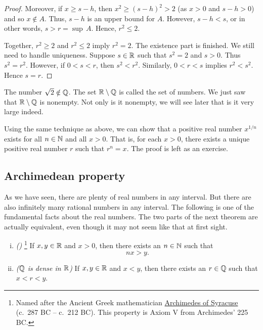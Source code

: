 \begin{example}
\begin{proof}
Moreover, if $x \geq s-h$,
then $x^2 \geq {(s-h)}^2 > 2$ (as $x > 0$ and $s-h > 0$) and so $x \notin A$.
Thus,
$s-h$ is an upper bound for $A$.  However, $s-h < s$,  or in other
words, $s > r = \sup\, A$.  Hence, $r^2 \leq 2$.

\medskip

Together, $r^2 \geq 2$ and $r^2 \leq 2$ imply
$r^2 = 2$.  The existence part is finished.  We still need to
handle uniqueness.  Suppose $s \in {\mathbb{R}}$ such that $s^2 = 2$ and $s > 0$.
Thus $s^2 = r^2$.  However, if $0 < s < r$, then $s^2 < r^2$.  Similarly,
$0 < r < s$ implies $r^2 < s^2$.  Hence $s = r$.
\end{proof}
\end{example}

The number $\sqrt{2} \notin {\mathbb{Q}}$.  The set
${\mathbb{R}} \setminus {\mathbb{Q}}$ is called the set of
\emph{} numbers.  We just saw that ${\mathbb{R}} \setminus {\mathbb{Q}}$
is nonempty.  Not only is it nonempty, we will see later that is it very
large indeed.

Using the same technique as above, we can show that a positive real
number $x^{1/n}$ exists for all $n\in {\mathbb{N}}$ and all $x > 0$.
That is, for each $x > 0$,
there exists a unique positive real number $r$ such that $r^n = x$.
The proof is left as an exercise.

\subsection{Archimedean property}

As we have seen, there are plenty of real numbers in any interval.  But
there are also infinitely many rational numbers in any interval.  The
following is one of the fundamental facts about the real numbers.
The two parts of the next theorem are actually equivalent, even though it may
not seem like that at first sight.


\pagebreak[3]
\begin{thm} \label{thm:arch}
\leavevmode
\begin{enumerate}[(i)]
\item \label{thm:arch:i} \emph{()}%
\footnote{Named after the Ancient Greek mathematician
\href{https://en.wikipedia.org/wiki/Archimedes}{Archimedes of Syracuse}
(c.\ 287 BC -- c.\ 212 BC)\@.
This property is Axiom V from Archimedes'  225
BC\@.}
If $x, y \in {\mathbb{R}}$ and
$x > 0$, then there exists an $n \in {\mathbb{N}}$ such that
\begin{equation*}
nx > y .
\end{equation*}
\item \label{thm:arch:ii} \emph{(${\mathbb{Q}}$ is dense in ${\mathbb{R}}$)} If $x, y \in {\mathbb{R}}$ and
$x < y$, then there exists an $r \in {\mathbb{Q}}$ such that
$x < r < y$.
\end{enumerate}
\end{thm}

